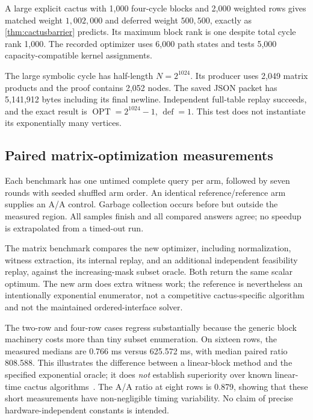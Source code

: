 \documentclass[11pt,letterpaper]{article}
\theoremstyle{definition}
\theoremstyle{remark}
\newcommand{\OPT}{\operatorname{OPT}}
\newcommand{\defw}{\operatorname{def}}
\begin{document}
A large explicit cactus with 1,000 four-cycle blocks and 2,000 weighted rows gives matched weight $1{,}002{,}000$ and deferred weight $500{,}500$, exactly as \cref{thm:cactusbarrier} predicts. Its maximum block rank is one despite total cycle rank 1,000. The recorded optimizer uses 6,000 path states and tests 5,000 capacity-compatible kernel assignments.

The large symbolic cycle has half-length $N=2^{1024}$. Its producer uses 2,049 matrix products and the proof contains 2,052 nodes. The saved JSON packet has 5,141,912 bytes including its final newline. Independent full-table replay succeeds, and the exact result is $\OPT=2^{1024}-1$, $\defw=1$. This test does not instantiate its exponentially many vertices.

\subsection{Paired matrix-optimization measurements}
Each benchmark has one untimed complete query per arm, followed by seven rounds with seeded shuffled arm order. An identical reference/reference arm supplies an A/A control. Garbage collection occurs before but outside the measured region. All samples finish and all compared answers agree; no speedup is extrapolated from a timed-out run.

The matrix benchmark compares the new optimizer, including normalization, witness extraction, its internal replay, and an additional independent feasibility replay, against the increasing-mask subset oracle. Both return the same scalar optimum. The new arm does extra witness work; the reference is nevertheless an intentionally exponential enumerator, not a competitive cactus-specific algorithm and not the maintained ordered-interface solver.
\begin{table}[htbp]
\centering

\caption{Unit-weight connected cactus matrices. ``Paired ratio'' is the median reference/new ratio; values above one favour the new arm. A/A is the median identical-reference ratio.}
\label{tab:matrix}
\end{table}

The two-row and four-row cases regress substantially because the generic block machinery costs more than tiny subset enumeration. On sixteen rows, the measured medians are 0.766 ms versus 625.572 ms, with median paired ratio 808.588. This illustrates the difference between a linear-block method and the specified exponential oracle; it does \emph{not} establish superiority over known linear-time cactus algorithms~\cite{ghl}. The A/A ratio at eight rows is 0.879, showing that these short measurements have non-negligible timing variability. No claim of precise hardware-independent constants is intended.
\end{document}
